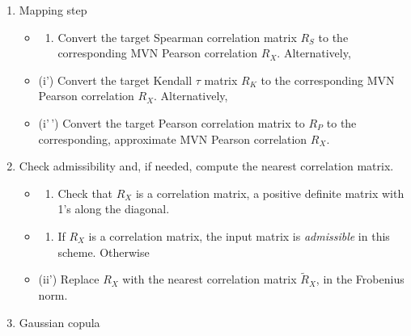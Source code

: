 \documentclass[
]{jss}
\providecommand{\tightlist}{%
  \setlength{\itemsep}{0pt}\setlength{\parskip}{0pt}}
\begin{document}
\begin{enumerate}
\def\labelenumi{\arabic{enumi}.}
\tightlist
\item
  Mapping step

  \begin{itemize}
  \item
    \begin{enumerate}
    \def\labelenumii{(\roman{enumii})}
    \tightlist
    \item
      Convert the target Spearman correlation matrix \(R_S\) to the corresponding MVN Pearson correlation \(R_X\). Alternatively,
    \end{enumerate}
  \item
    (i') Convert the target Kendall \(\tau\) matrix \(R_K\) to the corresponding MVN Pearson correlation \(R_X\). Alternatively,
  \item
    (i'\,') Convert the target Pearson correlation matrix to \(R_P\) to the corresponding, approximate MVN Pearson correlation \(R_X\).
  \end{itemize}
\item
  Check admissibility and, if needed, compute the nearest correlation matrix.

  \begin{itemize}
  \item
    \begin{enumerate}
    \def\labelenumii{(\roman{enumii})}
    \tightlist
    \item
      Check that \(R_X\) is a correlation matrix, a positive definite matrix with 1's along the diagonal.
    \end{enumerate}
  \item
    \begin{enumerate}
    \def\labelenumii{(\roman{enumii})}
    \setcounter{enumii}{1}
    \tightlist
    \item
      If \(R_X\) is a correlation matrix, the input matrix is \emph{admissible} in this scheme. Otherwise
    \end{enumerate}
  \item
    (ii') Replace \(R_X\) with the nearest correlation matrix \(\tilde{R}_X\), in the Frobenius norm.
  \end{itemize}
\item
  Gaussian copula


\end{enumerate}
\end{document}

